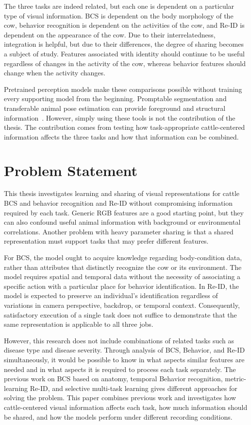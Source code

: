 The three tasks are indeed related, but each one is dependent on a particular type of visual information. BCS is dependent on the body morphology of the cow, behavior recognition is dependent on the activities of the cow, and Re-ID is dependent on the appearance of the cow. Due to their interrelatedness, integration is helpful, but due to their differences, the degree of sharing becomes a subject of study. Features associated with identity should continue to be useful regardless of changes in the activity of the cow, whereas behavior features should change when the activity changes.

Pretrained perception models make these comparisons possible without training every supporting model from the beginning. Promptable segmentation and transferable animal pose estimation can provide foreground and structural information~\cite{kirillov2023sam,ye2024superanimal}. However, simply using these tools is not the contribution of the thesis. The contribution comes from testing how task-appropriate cattle-centered information affects the three tasks and how that information can be combined.

\section{Problem Statement}

This thesis investigates learning and sharing of visual representations for cattle BCS and behavior recognition and Re-ID without compromising information required by each task. Generic RGB features are a good starting point, but they can also confound useful animal information with background or environmental correlations. Another problem with heavy parameter sharing is that a shared representation must support tasks that may prefer different features.

For BCS, the model ought to acquire knowledge regarding body-condition data, rather than attributes that distinctly recognize the cow or its environment. The model requires spatial and temporal data without the necessity of associating a specific action with a particular place for behavior identification. In Re-ID, the model is expected to preserve an individual's identification regardless of variations in camera perspective, backdrop, or temporal context. Consequently, satisfactory execution of a single task does not suffice to demonstrate that the same representation is applicable to all three jobs.

However, this research does not include combinations of related tasks such as disease type and disease severity. Through analysis of BCS, Behavior, and Re-ID simultaneously, it would be possible to know in what aspects similar features are needed and in what aspects it is required to process each task separately. The previous work on BCS based on anatomy, temporal Behavior recognition, metric-learning Re-ID, and selective multi-task learning gives different approaches for solving the problem. This paper combines previous work and investigates how cattle-centered visual information affects each task, how much information should be shared, and how the models perform under different recording conditions.

